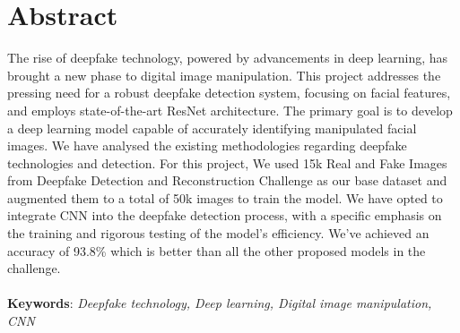 \large
\chapter*{Abstract}
The rise of deepfake technology, powered by advancements in deep learning, has brought a new phase to digital image manipulation. This project addresses the pressing need for a robust deepfake detection system, focusing on facial features, and employs state-of-the-art ResNet architecture. The primary goal is to develop a deep learning model capable of accurately identifying manipulated facial images. We have analysed the existing methodologies regarding deepfake technologies and detection. For this project, We used 15k Real and Fake Images from Deepfake Detection and Reconstruction Challenge as our base dataset and augmented them to a total of 50k images to train the model. We have opted to integrate CNN into the deepfake detection process, with a specific emphasis on the training and rigorous testing of the model's efficiency. We've achieved an accuracy of 93.8\% which is better than all the other proposed models in the challenge.\\\\
\textbf{Keywords}: \textit{Deepfake technology, Deep learning, Digital image manipulation, CNN}